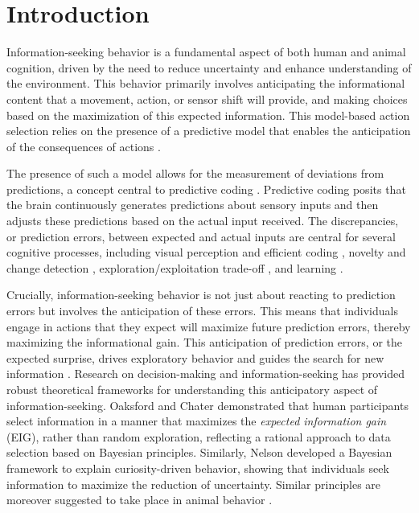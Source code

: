 \documentclass[10pt,letterpaper]{article}
\begin{document}

\section{Introduction}

Information-seeking behavior is a fundamental aspect of both human and animal cognition, driven by the need to reduce uncertainty and enhance understanding of the environment. This behavior primarily involves anticipating the informational content that a movement, action, or sensor shift will provide, and making choices based on the maximization of this expected information. This model-based action selection relies on the presence of a predictive model that enables the anticipation of the consequences of actions \cite{friston2010free}.

The presence of such a model allows for the measurement of deviations from predictions, a concept central to predictive coding \cite{rao1999predictive}. Predictive coding posits that the brain continuously generates predictions about sensory inputs and then adjusts these predictions based on the actual input received. The discrepancies, or prediction errors, between expected and actual inputs are central for several cognitive processes, including visual perception and efficient coding \cite{rao1999predictive,ITTI20091295}, novelty and change detection \cite{behrens2007learning, summerfield2009expectation,garrido2013outlier}, exploration/exploitation trade-off \cite{cohen2007should,wilson2014humans}, and learning \cite{schulz2007serious,oudeyer2016intrinsic}.

Crucially, information-seeking behavior is not just about reacting to prediction errors but involves the anticipation of these errors. This means that individuals engage in actions that they expect will maximize future prediction errors, thereby maximizing the informational gain. This anticipation of prediction errors, or the expected surprise, drives exploratory behavior and guides the search for new information \cite{friston2012perceptions}.
Research on decision-making and information-seeking has provided robust theoretical frameworks for understanding this anticipatory aspect of information-seeking. Oaksford and Chater \cite{oaksford1994rational} demonstrated that human participants select information in a manner that maximizes the \emph{expected information gain} (EIG), rather than random exploration, reflecting a rational approach to data selection based on Bayesian principles. Similarly, Nelson \cite{nelson2005finding} developed a Bayesian framework to explain curiosity-driven behavior, showing that individuals seek information to maximize the reduction of uncertainty. Similar principles are moreover suggested to take place in animal behavior \cite{gottlieb2013information,kidd2015psychology}.
\end{document}
